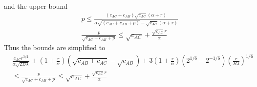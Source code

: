 \documentclass[12pt]{article}
\theoremstyle{plain}
\theoremstyle{remark}
\theoremstyle{definition}
\renewcommand{\leq}{\leqslant}
\renewcommand{\leq}{\leqslant}
\begin{document}
and the upper bound
\begin{align}
  &p \leq  \frac{(c_{AC}+c_{AB})\sqrt{c_{AC}}(\alpha + r)}{\alpha\sqrt{(c_{AC}+c_{AB}+p)}-\sqrt{c_{AC}}(\alpha + r)}\\
  & \frac{p}{\sqrt{c_{AC}+c_{AB}+p}}\leq  \sqrt{c_{AC}}+\frac{\sqrt{c_{AC}}r}{\alpha}
\end{align}
Thus the bounds are simplified to 
\begin{align}
  &\frac{c_{AC}r^{3/2}}{\alpha\sqrt{2B\lambda} } + (1+\frac{r}{\alpha})(\sqrt{c_{AB}+ c_{AC}}-\sqrt{c_{AB}})+ 3(1+\frac{r}{\alpha})(2^{1/6}-2^{-1/6})(\frac{r}{B\lambda})^{1/6} \\
  & \leq \frac{p}{\sqrt{c_{AC}+c_{AB}+p}} \leq \sqrt{c_{AC}}+\frac{\sqrt{c_{AC}}r}{\alpha}
\end{align}
\end{document}
